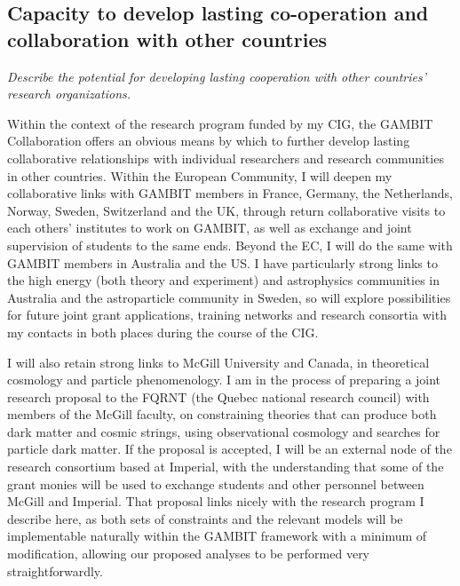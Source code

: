 \documentclass[a4paper,11pt]{article}
\newenvironment{xcomment}{\em}{}
\begin{document}
\subsection{Capacity to develop lasting co-operation and collaboration with other countries}

\begin{xcomment}
Describe the potential for developing lasting cooperation with other
countries' research organizations.
\end{xcomment}

Within the context of the research program funded by my CIG, the GAMBIT Collaboration offers an obvious means by which to further develop lasting collaborative relationships with individual researchers and research communities in other countries.  Within the European Community, I will deepen my collaborative links with GAMBIT members in France, Germany, the Netherlands, Norway, Sweden, Switzerland and the UK, through return collaborative visits to each others' institutes to work on GAMBIT, as well as exchange and joint supervision of students to the same ends.  Beyond the EC, I will do the same with GAMBIT members in Australia and the US.  I have particularly strong links to the high energy (both theory and experiment)  and astrophysics communities in Australia and the astroparticle community in Sweden, so will explore possibilities for future joint grant applications, training networks and research consortia with my contacts in both places during the course of the CIG.  

I will also retain strong links to McGill University and Canada, in theoretical cosmology and particle phenomenology.  I am in the process of preparing a joint research proposal to the FQRNT (the Quebec national research council) with members of the McGill faculty, on constraining theories that can produce both dark matter and cosmic strings, using observational cosmology and searches for particle dark matter.  If the proposal is accepted, I will be an external node of the research consortium based at Imperial, with the understanding that some of the grant monies will be used to exchange students and other personnel between McGill and Imperial.  That proposal links nicely with the research program I describe here, as both sets of constraints and the relevant models will be implementable naturally within the GAMBIT framework with a minimum of modification, allowing our proposed analyses to be performed very straightforwardly.
\end{document}
